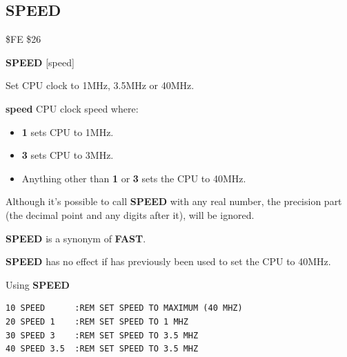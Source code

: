 \subsection{SPEED}
\begin{description}[leftmargin=2cm,style=nextline]
\item [Token:] \$FE \$26
\item [Format:] {\bf SPEED} [speed]
\item [Usage:] Set CPU clock to 1MHz, 3.5MHz or 40MHz.

               {\bf speed} CPU clock speed where:
               \begin{itemize}
                   \item {\bf 1} sets CPU to 1MHz.
                   \item {\bf 3} sets CPU to 3MHz.
                   \item Anything other than {\bf 1} or {\bf 3} sets the CPU to 40MHz.
               \end{itemize}
\item [Remarks:] Although it's possible to call {\bf SPEED}
                 with any real number, the precision part (the decimal point
                 and any digits after it), will be ignored.

                {\bf SPEED} is a synonym of {\bf FAST}.

                {\bf SPEED} has no effect if 
                has previously been used to set the CPU to 40MHz.

\item [Example:] Using {\bf SPEED}
\begin{tcolorbox}[colback=black,coltext=white]
\verbatimfont{\codefont}
\begin{verbatim}
10 SPEED      :REM SET SPEED TO MAXIMUM (40 MHZ)
20 SPEED 1    :REM SET SPEED TO 1 MHZ
30 SPEED 3    :REM SET SPEED TO 3.5 MHZ
40 SPEED 3.5  :REM SET SPEED TO 3.5 MHZ
\end{verbatim}
\end{tcolorbox}
\end{description}


\newpage
